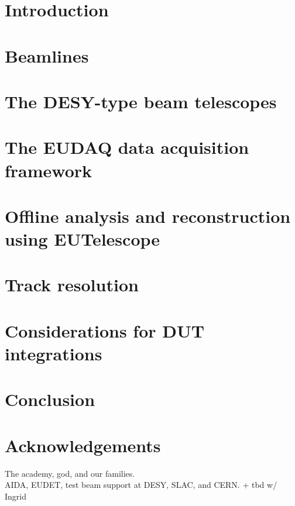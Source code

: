 \documentclass[a4paper,10pt]{scrartcl}
\begin{document}
\tableofcontents


\section{Introduction}
\label{sec:intro}


\section{Beamlines}
\label{sec:beamlines}


\section{The DESY-type beam telescopes}
\label{sec:tscope}


\section{The EUDAQ data acquisition framework}
\label{sec:eudaq}


\section{Offline analysis and reconstruction using EUTelescope}
\label{sec:offline}


\section{Track resolution}
\label{sec:trackres}


\section{Considerations for DUT integrations}
\label{sec:dutintegration}


\section{Conclusion}
\label{sec:conclusion}



\section*{Acknowledgements}
The academy, god, and our families. \\
AIDA, EUDET, test beam support at DESY, SLAC, and CERN. + tbd w/ Ingrid

\small


\end{document}
